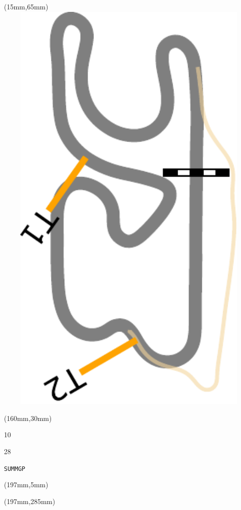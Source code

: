 \begin{textblock*}{185mm}(15mm,65mm)%
\centering
\mbox{\includegraphics[width=185mm,height=210mm,keepaspectratio]{PT/SUMMGP.pdf}}
\end{textblock*}
\begin{textblock*}{40mm}(160mm,30mm)%
\Large
\par{} 
\par10 
\par28 
\par\hfill\tiny\tt SUMMGP\\
\end{textblock*}
\begin{textblock*}{20mm}(197mm,5mm)%
\fbox{\thepage}
\label{SUMMGP}
\end{textblock*}
\begin{textblock*}{20mm}(197mm,285mm)%
\fbox{\thepage}
\end{textblock*}

